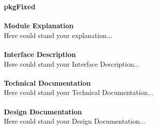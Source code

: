 \documentclass[../../../../doc/ASP-SoC_doc/main.tex]{subfiles}
\begin{document}
\textbf{pkgFixed}
\\\\
\textbf{Module Explanation}
\\
Here could stand your explanation...\\
\\
\textbf{Interface Description}
\\
Here could stand your Interface Description...\\
\\
\textbf{Technical Documentation}
\\
Here could stand your Technical Documentation...\\
\\
\textbf{Design Documentation}
\\
Here could stand your Design Documentation...\\
\\
\end{document}
